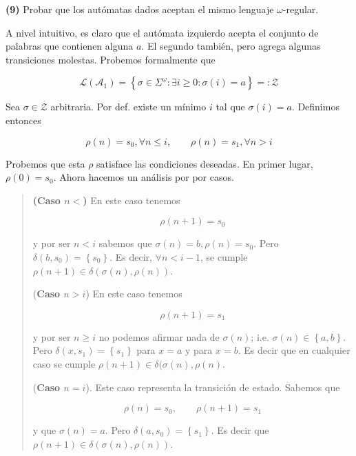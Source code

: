 \documentclass[a4paper, 12pt]{article}
\begin{document}
\pagebreak 

\begin{myframe}
\textbf{(9)} Probar que los autómatas dados aceptan el mismo lenguaje
$\omega$-regular.
\end{myframe}

A nivel intuitivo, es claro que el autómata izquierdo acepta el conjunto de
palabras que contienen alguna $a$. El segundo también, pero agrega algunas
transiciones molestas. Probemos formalmente que 

\begin{equation*}
    \mathcal{L}(\mathcal{A}_1) = \left\{ \sigma \in \Sigma^\omega : \exists i
    \geq 0 : \sigma(i) = a \right\} =: \mathcal{Z}
\end{equation*}

Sea $\sigma \in \mathcal{Z}$ arbitraria. Por def. existe un mínimo $i$ tal que 
$\sigma(i) = a$. Definimos entonces 

\begin{equation*}
    \rho(n) = s_0, \forall  n \leq i, \qquad \rho(n) = s_1, \forall  n > i
\end{equation*}

Probemos que esta $\rho$ satisface las condiciones deseadas. En primer lugar,
$\rho(0) = s_0$. Ahora hacemos un análisis por por casos. 


\small
\begin{quote}

\textbf{(Caso $n < $)} En este caso tenemos

\begin{equation*}
    \rho(n + 1) = s_0
\end{equation*}

y por ser $n < i$ sabemos que $\sigma(n) = b, \rho(n) = s_0$. Pero $\delta(b,
s_0) = \left\{ s_0 \right\} $. Es decir, $\forall n < i - 1$, se cumple
$\rho(n+1) \in \delta(\sigma(n), \rho(n))$. 

(\textbf{Caso $n > i$}) En este caso tenemos 

\begin{equation*}
    \rho(n+1) = s_1
\end{equation*}

y por ser $n \geq i$ no podemos afirmar nada de $\sigma(n)$; i.e. $\sigma(n) \in
\left\{ a, b \right\} $. Pero $\delta(x, s_1) = \left\{ s_1 \right\} $ para $x =
a$ y para $x = b$. Es decir que en cualquier caso se cumple $\rho(n+1) \in
\delta(\sigma(n), \rho(n)$.

(\textbf{Caso $n = i$}). Este caso representa la transición de estado.
Sabemos que 

\begin{equation*}
    \rho(n) = s_0, \qquad \rho(n+1) = s_1
\end{equation*}

y que $\sigma(n) = a$. Pero $\delta(a, s_0) = \left\{ s_1 \right\} $. Es decir
que $\rho(n+1) \in \delta(\sigma(n), \rho(n))$.

\end{quote}
\normalsize
\end{document}

